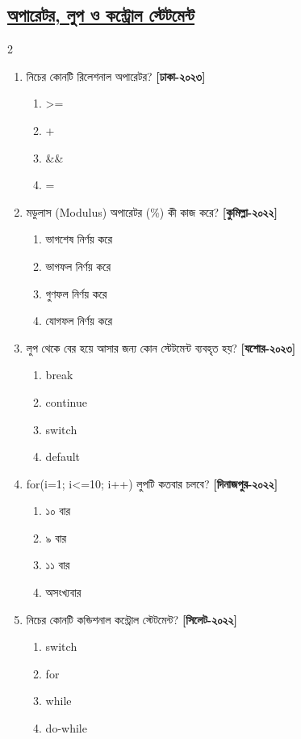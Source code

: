 \subsection*{\textbf{\underline{অপারেটর, লুপ ও কন্ট্রোল স্টেটমেন্ট}}}

\begin{multicols}{2}
\begin{enumerate}[resume]

\item নিচের কোনটি রিলেশনাল অপারেটর? \textbf{[ঢাকা-২০২৩]}
\begin{enumerate}[label=\alph*)]
\item >= \checkmark
\item +
\item \&\&
\item =
\end{enumerate}

\item মডুলাস (Modulus) অপারেটর (\%) কী কাজ করে? \textbf{[কুমিল্লা-২০২২]}
\begin{enumerate}[label=\alph*)]
\item ভাগশেষ নির্ণয় করে \checkmark
\item ভাগফল নির্ণয় করে
\item গুণফল নির্ণয় করে
\item যোগফল নির্ণয় করে
\end{enumerate}

\item লুপ থেকে বের হয়ে আসার জন্য কোন স্টেটমেন্ট ব্যবহৃত হয়? \textbf{[যশোর-২০২৩]}
\begin{enumerate}[label=\alph*)]
\item break \checkmark
\item continue
\item switch
\item default
\end{enumerate}

\item for(i=1; i<=10; i++) লুপটি কতবার চলবে? \textbf{[দিনাজপুর-২০২২]}
\begin{enumerate}[label=\alph*)]
\item ১০ বার \checkmark
\item ৯ বার
\item ১১ বার
\item অসংখ্যবার
\end{enumerate}

\item নিচের কোনটি কন্ডিশনাল কন্ট্রোল স্টেটমেন্ট? \textbf{[সিলেট-২০২২]}
\begin{enumerate}[label=\alph*)]
\item switch \checkmark
\item for
\item while
\item do-while
\end{enumerate}

\end{enumerate}
\end{multicols}

